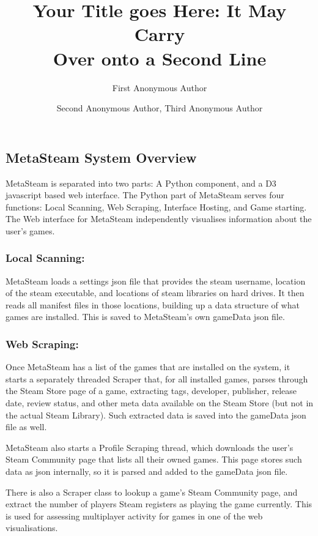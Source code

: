 \documentclass[11pt]{article}
\title{\addvspace{-2\baselineskip}Your Title goes Here: It May Carry \\
Over onto a Second Line}
\author{First Anonymous Author}
\affil{Institutional Affiliation \\
Address line 1 \\
Address line 2 \\
telephone \\
firstauthor@institution.com }
\author{Second Anonymous Author, Third Anonymous Author}
\affil{Institutional Affiliation \\
Address line 1 \\
Address line 2 \\
telephone \\
secondauthor@institution.com, thirdauthor@institution.com}
\date{\vspace{-60pt}}
\begin{document}
\newpage
{}  
   \maketitle
    \copyrightnotice
 
\subsection*{MetaSteam System Overview}

MetaSteam is separated into two parts: A Python component, and a D3 javascript based web interface. The Python part of MetaSteam serves four functions: Local Scanning, Web Scraping, Interface Hosting, and Game starting. The Web interface for MetaSteam independently visualises information about the user's games.


\subsubsection*{Local Scanning:}
MetaSteam loads a settings json file that provides the steam username, location of the steam executable, and locations of steam libraries on hard drives. It then reads all manifest files in those locations, building up a data structure of what games are installed. This is saved to MetaSteam's own gameData json file.

\subsubsection*{Web Scraping:}
Once MetaSteam has a list of the games that are installed on the system, it starts a separately threaded Scraper that, for all installed games, parses through the Steam Store page of a game, extracting tags, developer, publisher, release date, review status, and other meta data available on the Steam Store (but not in the actual Steam Library). Such extracted data is saved into the gameData json file as well.

MetaSteam also starts a Profile Scraping thread, which downloads the user's Steam Community page that lists all their owned games. This page stores such data as json internally, so it is parsed and added to the gameData json file.

There is also a Scraper class to lookup a game's Steam Community page, and extract the number of players Steam registers as playing the game currently. This is used for assessing multiplayer activity for games in one of the web visualisations.
\end{document}
